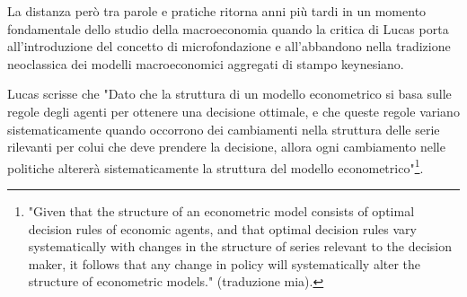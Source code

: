 \documentclass[a4paper, headings=standardclasses]{scrartcl}
\begin{document}
La distanza però tra parole e pratiche ritorna anni più tardi in un momento fondamentale dello studio della macroeconomia quando la critica di Lucas \parencite{lucas1976} porta all'introduzione del concetto di microfondazione e all'abbandono nella tradizione neoclassica dei modelli macroeconomici aggregati di stampo keynesiano.

Lucas scrisse che "Dato che la struttura di un modello econometrico si basa sulle regole degli agenti per ottenere una decisione ottimale, e che queste regole variano sistematicamente quando occorrono dei cambiamenti nella struttura delle serie rilevanti per colui che deve prendere la decisione, allora ogni cambiamento nelle politiche altererà sistematicamente la struttura del modello econometrico"\footnote{"Given that the structure of an econometric model consists of optimal decision rules of economic agents, and that optimal decision rules vary systematically with changes in the structure of series relevant to the decision maker, it follows that any change in policy will systematically alter the structure of econometric models." \parencite{lucas1976} (traduzione mia).}.
\end{document}
